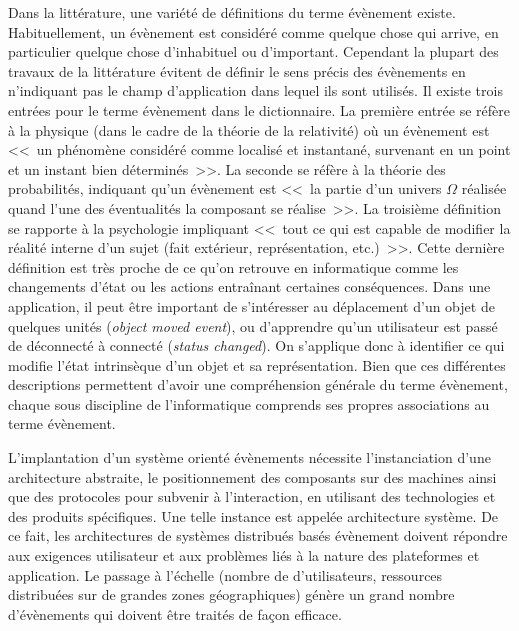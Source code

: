 Dans la littérature, une variété de définitions du terme évènement existe. 
Habituellement, un évènement est considéré comme quelque chose qui 
\og arrive\fg{}, en particulier quelque chose d'inhabituel ou d'important. 
Cependant la plupart des travaux de la littérature évitent de définir le sens précis 
des évènements en n'indiquant pas le champ d'application dans lequel ils sont 
utilisés. 
Il existe trois entrées pour le terme évènement dans le dictionnaire. 
La première entrée se réfère à la physique (dans le cadre de la théorie 
de la relativité) où un évènement est <<~un phénomène considéré comme localisé 
et instantané, survenant en un point et un instant bien déterminés~>>. La seconde 
se réfère à la théorie des probabilités,  indiquant qu'un évènement est <<~la partie 
d'un univers $\Omega$ réalisée quand l'une des éventualités la composant se 
réalise~>>. La troisième définition se rapporte à la psychologie impliquant <<~tout 
ce qui est capable de modifier la réalité interne d'un sujet (fait extérieur, 
représentation, etc.)~>>. Cette dernière définition est très proche de ce qu'on 
retrouve en informatique comme les changements d'état ou les actions entraînant 
certaines conséquences. Dans une application, il peut être important de 
s'intéresser au déplacement d'un objet de quelques unités (\textit{object moved 
	event}), ou d'apprendre qu'un utilisateur est passé de déconnecté à connecté 
(\textit{status changed}). On s'applique donc à identifier ce qui modifie l'état 
intrinsèque d'un objet et sa représentation. Bien que ces différentes descriptions 
permettent d'avoir une compréhension générale du terme évènement, chaque sous 
discipline de l'informatique comprends 
ses propres associations au terme évènement.

L'implantation d'un système orienté évènements nécessite l'instanciation d'une 
architecture abstraite, 
le positionnement des composants sur des machines ainsi que des protocoles 
pour subvenir à l'interaction, en utilisant des technologies et des produits 
spécifiques. Une telle instance est appelée architecture système. De ce fait, les 
architectures de systèmes distribués basés évènement doivent 
répondre aux exigences utilisateur et aux problèmes liés à la nature des 
plateformes et application. 
Le passage à l'échelle (nombre de d'utilisateurs, ressources distribuées sur de 
grandes zones géographiques) génère un grand nombre d'évènements qui doivent 
être traités de façon efficace. 

